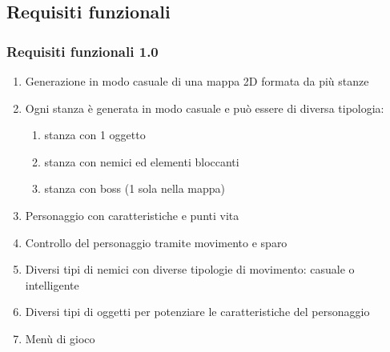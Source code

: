 \subsection{Requisiti funzionali}
\subsubsection{Requisiti funzionali 1.0}
\begin{enumerate}
    \item Generazione in modo casuale di una mappa 2D formata da più stanze
    \item Ogni stanza è generata in modo casuale e può essere di diversa tipologia:
        \begin{enumerate}
            \item stanza con 1 oggetto
            \item stanza con nemici ed elementi bloccanti
            \item stanza con boss (1 sola nella mappa)
        \end{enumerate}
    \item Personaggio con caratteristiche e punti vita
    \item Controllo del personaggio tramite movimento e sparo
    \item Diversi tipi di nemici con diverse tipologie di movimento: casuale o intelligente
    \item Diversi tipi di oggetti per potenziare le caratteristiche del personaggio
    \item Menù di gioco
\end{enumerate}

